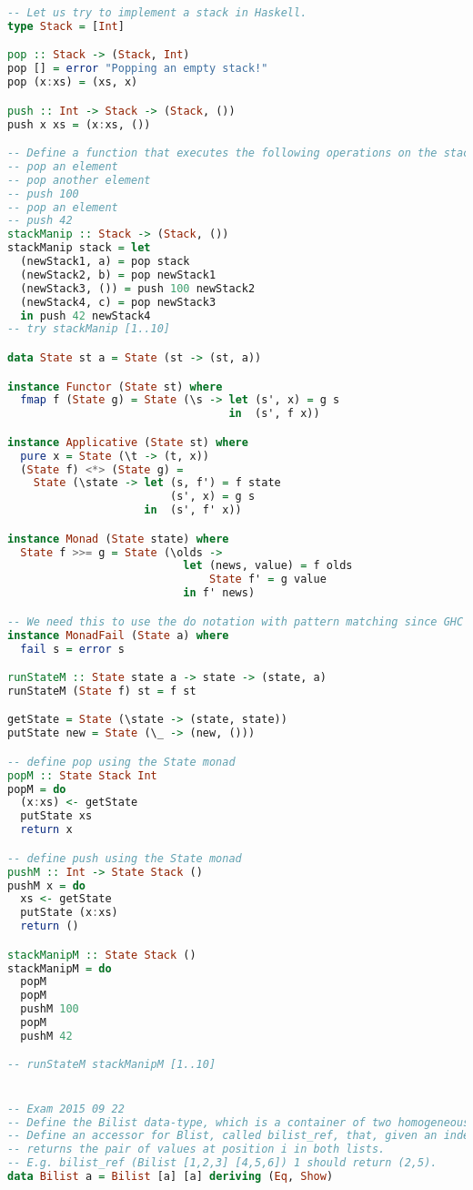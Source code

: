 \begin{lstlisting}[language=Haskell]
-- Let us try to implement a stack in Haskell.
type Stack = [Int]

pop :: Stack -> (Stack, Int)
pop [] = error "Popping an empty stack!"
pop (x:xs) = (xs, x)

push :: Int -> Stack -> (Stack, ())
push x xs = (x:xs, ())

-- Define a function that executes the following operations on the stack:
-- pop an element
-- pop another element
-- push 100
-- pop an element
-- push 42
stackManip :: Stack -> (Stack, ())
stackManip stack = let
  (newStack1, a) = pop stack
  (newStack2, b) = pop newStack1
  (newStack3, ()) = push 100 newStack2
  (newStack4, c) = pop newStack3
  in push 42 newStack4
-- try stackManip [1..10]

data State st a = State (st -> (st, a))

instance Functor (State st) where
  fmap f (State g) = State (\s -> let (s', x) = g s
                                  in  (s', f x))

instance Applicative (State st) where
  pure x = State (\t -> (t, x))
  (State f) <*> (State g) =
    State (\state -> let (s, f') = f state
                         (s', x) = g s
                     in  (s', f' x))

instance Monad (State state) where
  State f >>= g = State (\olds ->
                           let (news, value) = f olds
                               State f' = g value
                           in f' news)

-- We need this to use the do notation with pattern matching since GHC 8.6.1.
instance MonadFail (State a) where
  fail s = error s

runStateM :: State state a -> state -> (state, a)
runStateM (State f) st = f st

getState = State (\state -> (state, state))
putState new = State (\_ -> (new, ()))

-- define pop using the State monad
popM :: State Stack Int
popM = do
  (x:xs) <- getState
  putState xs
  return x

-- define push using the State monad
pushM :: Int -> State Stack ()
pushM x = do
  xs <- getState
  putState (x:xs)
  return ()

stackManipM :: State Stack ()
stackManipM = do
  popM
  popM
  pushM 100
  popM
  pushM 42

-- runStateM stackManipM [1..10]


-- Exam 2015 09 22
-- Define the Bilist data-type, which is a container of two homogeneous lists.
-- Define an accessor for Blist, called bilist_ref, that, given an index i, 
-- returns the pair of values at position i in both lists.
-- E.g. bilist_ref (Bilist [1,2,3] [4,5,6]) 1 should return (2,5).
data Bilist a = Bilist [a] [a] deriving (Eq, Show)


\end{lstlisting}
